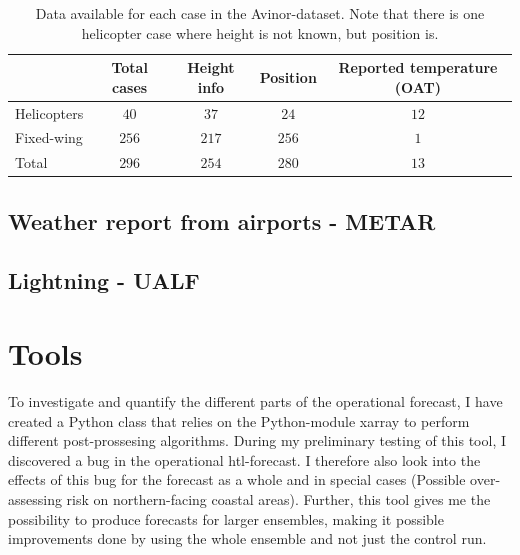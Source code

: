 \begin{table}
\begin{tabular}{ l|c|c|c|c| } 
		&Total cases & Height info & Position & Reported temperature (OAT) \\
 		\hline
 		Helicopters &$40$ & $37$ & $24$ & $12$\\ 
 		Fixed-wing &$256$ & $217$ & $256$ & $1$\\ 
 		\hline
 		Total &$296$ &$254$ & $280$ & $13$\\ 
 		\hline
\end{tabular}
\caption{Data available for each case in the Avinor-dataset. Note that there is one helicopter case where height is not known, but position is. }
\label{tab:avinor}
\end{table}

\subsection{Weather report from airports - METAR}


\subsection{Lightning - UALF}

\section{Tools}
To investigate and quantify the different parts of the operational forecast, I have created a Python class that relies on the Python-module xarray to perform different post-prossesing algorithms. During my preliminary testing of this tool, I discovered a bug in the operational \acrshort{htl}-forecast. I therefore also look into the effects of this bug for the forecast as a whole and in special cases (Possible over-assessing risk on northern-facing coastal areas). Further, this tool gives me the possibility to produce forecasts for larger ensembles, making it  possible improvements done by using the whole ensemble and not just the control run.
